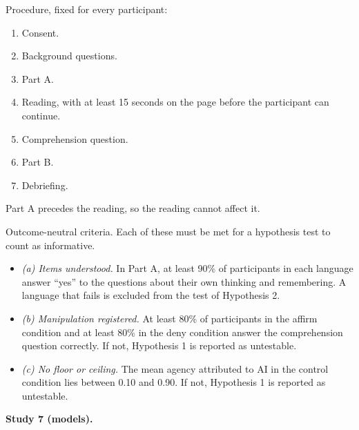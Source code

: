 \documentclass[
  11pt,
]{article}
\providecommand{\tightlist}{%
  \setlength{\itemsep}{0pt}\setlength{\parskip}{0pt}}
\begin{document}
Procedure, fixed for every participant:

\begin{enumerate}
\def\labelenumi{\arabic{enumi}.}
\tightlist
\item
  Consent.
\item
  Background questions.
\item
  Part A.
\item
  Reading, with at least 15 seconds on the page before the participant
  can continue.
\item
  Comprehension question.
\item
  Part B.
\item
  Debriefing.
\end{enumerate}

Part A precedes the reading, so the reading cannot affect it.

Outcome-neutral criteria. Each of these must be met for a hypothesis
test to count as informative.

\begin{itemize}
\tightlist
\item
  \emph{(a) Items understood.} In Part A, at least 90\% of participants
  in each language answer ``yes'' to the questions about their own
  thinking and remembering. A language that fails is excluded from the
  test of Hypothesis 2.
\item
  \emph{(b) Manipulation registered.} At least 80\% of participants in
  the affirm condition and at least 80\% in the deny condition answer
  the comprehension question correctly. If not, Hypothesis 1 is reported
  as untestable.
\item
  \emph{(c) No floor or ceiling.} The mean agency attributed to AI in
  the control condition lies between 0.10 and 0.90. If not, Hypothesis 1
  is reported as untestable.
\end{itemize}

\textbf{Study 7 (models).}
\end{document}
